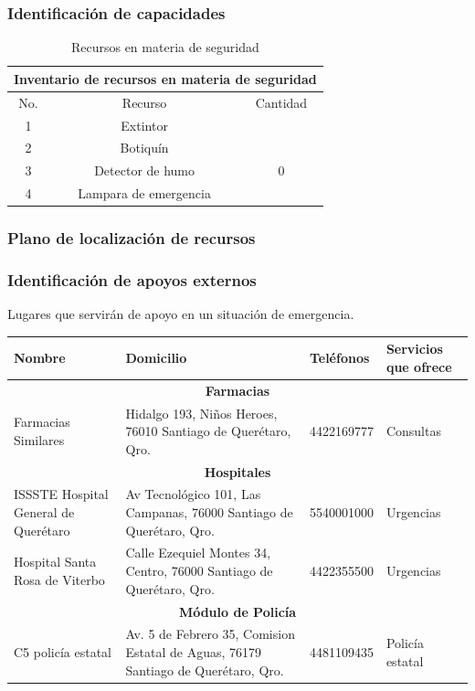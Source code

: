     \subsubsection{Identificación de capacidades}
    
    \begin{table}[H]
        \centering
        \caption{Recursos en materia de seguridad}
        \begin{tabular}{c c c}
        \hline
        \multicolumn{3}{c}{Inventario de recursos en materia de seguridad}\\
        \hline
             No.& Recurso & Cantidad  \\
        \hline
             1& Extintor &  \\
        \hline
             2& Botiquín &  \\
        \hline
             3& Detector de humo & 0 \\
        \hline
             4& Lampara de emergencia &  \\
        \hline     
        \end{tabular}
        \label{tab:inventario}
    \end{table}
    
    \subsubsection{Plano de localización de recursos}
    \centering
    \subsubsection{ Identificación de apoyos externos}
    
    Lugares que servirán de apoyo en un situación de emergencia.
    
    \begin{tabular}{|p{5em}|p{6em}|p{5em}|p{5em}|}
             \hline
             \textbf{Nombre}& \textbf{Domicilio}& \textbf{Teléfonos}& \textbf{Servicios que ofrece}\\
            \hline
        \multicolumn{4}{c}{\textbf{Farmacias}}\\
        \hline
             Farmacias Similares &Hidalgo 193, Niños Heroes, 76010 Santiago de Querétaro, Qro.& 4422169777& Consultas\\
             \hline
             \multicolumn{4}{c}{\textbf{Hospitales}}\\
        \hline
              ISSSTE Hospital General de Querétaro& Av Tecnológico 101, Las Campanas, 76000 Santiago de Querétaro, Qro.&5540001000&Urgencias\\
              \hline
              Hospital Santa Rosa de Viterbo& Calle Ezequiel Montes 34, Centro, 76000 Santiago de Querétaro, Qro.& 4422355500&Urgencias\\
              \hline
             \multicolumn{4}{c}{\textbf{Módulo de Policía}}\\
        \hline
             C5 policía estatal&Av. 5 de Febrero 35, Comision Estatal de Aguas, 76179 Santiago de Querétaro, Qro.& 4481109435&Policía estatal\\         
              \hline
         \end{tabular}
    
